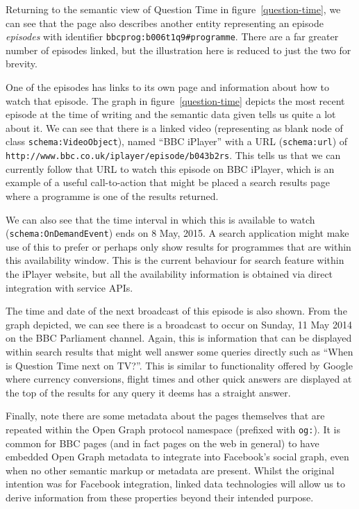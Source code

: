 Returning to the semantic view of Question Time in figure~\ref{question-time},
we can see that the page also describes another entity representing
an episode \emph{episodes} with identifier \texttt{bbcprog:b006t1q9\#programme}.
There are a far greater
number of episodes linked, but the illustration here is reduced to
just the two for brevity.

One of the episodes has links to its own page and information
about how to watch that episode. The graph in figure~\ref{question-time}
depicts the most recent episode at the time of writing and the
semantic data given tells us quite a lot about it. We can see
that there is a linked video (representing as blank node of
class \texttt{schema:VideoObject}), named ``BBC iPlayer'' with
a URL (\texttt{schema:url}) of \texttt{http://www.bbc.co.uk/iplayer/episode/b043b2rs}.
This tells us that we can currently follow that URL to watch
this episode on BBC iPlayer, which is an example of a useful
call-to-action that might be placed a search results page where
a programme is one of the results returned.

We can also see that the time interval in which this is available
to watch (\texttt{schema:OnDemandEvent}) ends on 8 May, 2015. A
search application might make use of this to prefer or perhaps
only show results for programmes that are within this availability
window. This is the current behaviour for search feature within
the iPlayer website, but all the availability information is
obtained via direct integration with service APIs.

The time and date of the next broadcast of this episode is also shown.
From the graph depicted, we can see there is a
broadcast to occur on Sunday, 11 May 2014 on the BBC Parliament
channel. Again, this is information that can be displayed within
search results that might well answer some queries directly
such as ``When is Question Time next on TV?''. This is similar
to functionality offered by Google where currency conversions,
flight times and other quick answers are displayed at the top
of the results for any query it deems has a straight answer.

Finally, note there are some metadata about the pages themselves
that are repeated within the Open Graph protocol namespace
(prefixed with \texttt{og:}). It is common for BBC pages (and
in fact pages on the web in general) to have embedded Open
Graph metadata to integrate into Facebook's social graph, even
when no other semantic markup or metadata are present. Whilst
the original intention was for Facebook integration, linked
data technologies will allow us to derive information from
these properties beyond their intended purpose.

